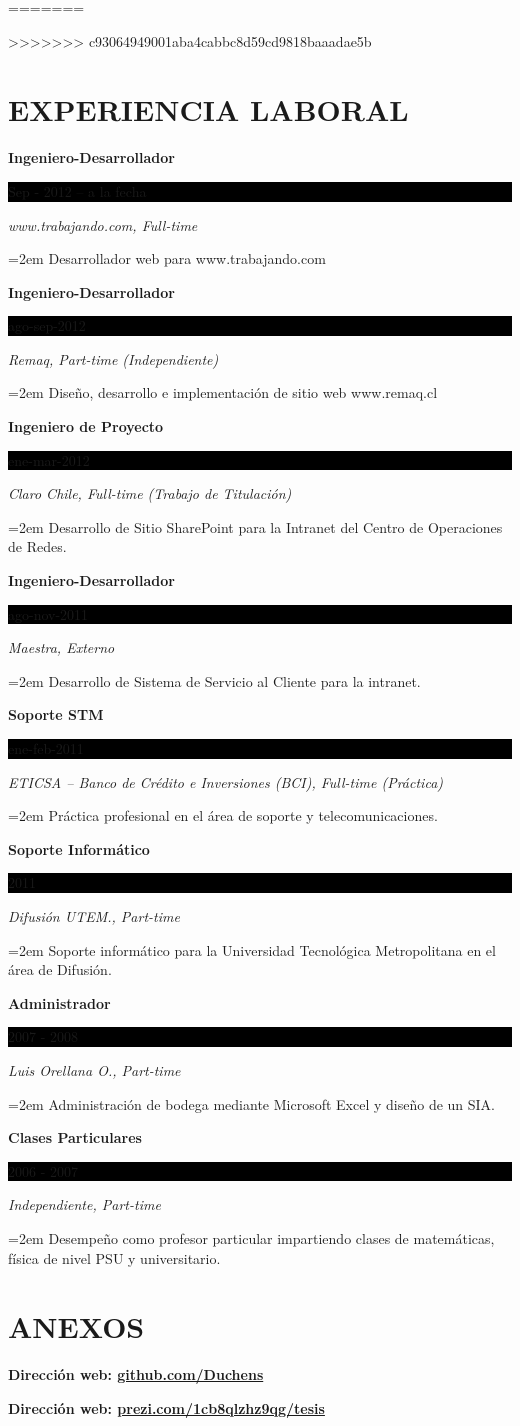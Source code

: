 \documentclass[paper=a4,fontsize=11pt]{scrartcl}	 			%
\newcommand{\sepspace}{\vspace*{1em}}			%
\newcommand{\NewPart}[1]{\section*{\uppercase{#1}}}
\newcommand{\EducationEntry}[4]{
		\noindent \textbf{#1} \hfill 					%
		\colorbox{Black}{%
			\parbox{6em}{%
			\hfill\color{White}#2}} \par				%
		\noindent \textit{#3} \par					%
		\noindent\hangindent=2em\hangafter=0 \small #4 	%
		\normalsize \par}
\begin{document}
=======
 
>>>>>>> c93064949001aba4cabbc8d59cd9818baaadae5b
\NewPart{Experiencia Laboral}{}

\EducationEntry{Ingeniero-Desarrollador}{Sep - 2012 -- a la fecha}{www.trabajando.com,  Full-time}{Desarrollador web para  www.trabajando.com}

\sepspace

\EducationEntry{Ingeniero-Desarrollador}{ago-sep-2012}{Remaq,  Part-time (Independiente)}{Diseño, desarrollo e implementación de sitio web www.remaq.cl}

\sepspace

\EducationEntry{Ingeniero de Proyecto}{ene-mar-2012}{Claro Chile,  Full-time (Trabajo de Titulación)}{Desarrollo de Sitio SharePoint para la Intranet del Centro de Operaciones de Redes.}

\sepspace

\EducationEntry{Ingeniero-Desarrollador}{ago-nov-2011}{Maestra, Externo}{Desarrollo de Sistema de Servicio al Cliente para la intranet.}

\sepspace

\EducationEntry{Soporte STM}{ene-feb-2011}{ETICSA – Banco de Crédito e Inversiones (BCI), Full-time (Práctica)}{Práctica profesional en el área de soporte y telecomunicaciones.}

 
\sepspace

\EducationEntry{Soporte Informático}{2011}{Difusión UTEM., Part-time}{Soporte informático para la Universidad Tecnológica Metropolitana en el área de Difusión.}

\sepspace

\EducationEntry{Administrador}{2007 - 2008}{Luis Orellana O., Part-time}{Administración de bodega mediante Microsoft Excel y diseño de un SIA.}


\sepspace

\EducationEntry{Clases Particulares}{2006 - 2007}{Independiente, Part-time}{Desempeño como profesor particular impartiendo  clases de matemáticas, física de nivel PSU y universitario. }

\NewPart{Anexos}{}
\textbf{Dirección web: \hspace{0.6cm}   \url{github.com/Duchens}}

\sepspace

\textbf{Dirección web:  \hspace{0.6cm}  \url{prezi.com/1cb8qlzhz9qg/tesis}}
\end{document}
